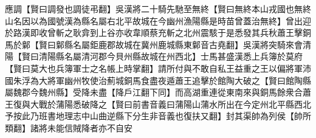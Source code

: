 應調【賢曰調發也調徒弔翻】吳漢將二十騎先馳至無終【賢曰無終本山戎國也無終山名因以為國號漢為縣名屬右北平故城在今幽州漁陽縣是時苗曾蓋治無終】曾出迎於路漢即收曾斬之耿弇到上谷亦收韋順蔡充斬之北州震駭于是悉發其兵秋蕭王擊銅馬於鄡【賢曰鄡縣名屬鉅鹿郡故城在冀州鹿城縣東鄡音古堯翻】吳漢將突騎來會清陽【賢曰清陽縣名屬清河郡今貝州縣故城在州西北】士馬甚盛漢悉上兵簿於莫府【賢曰莫大也兵簿軍士之名帳上時掌翻】請所付與不敢自私王益重之王以偏將軍沛國朱浮為大將軍幽州牧使治薊城銅馬食盡夜遁蕭王追擊於館陶大破之【賢曰館陶縣屬魏郡今魏州縣】受降未盡【降戶江翻下同】而高湖重連從東南來與銅馬餘衆合蕭王復與大戰於蒲陽悉破降之【賢曰前書音義曰蒲陽山蒲水所出在今定州北平縣西北予按此乃班書地理志中山曲逆縣下分生非音義也復扶又翻】封其渠帥為列侯【帥所類翻】諸將未能信賊降者亦不自安